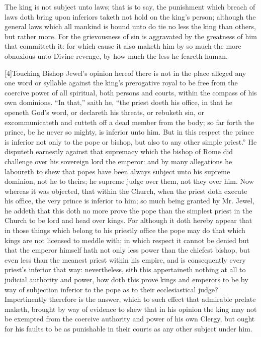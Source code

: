 The king is not subject unto laws; that is to say, the punishment which breach of laws doth bring upon inferiors  taketh not hold on the king’s person; although the general laws which all mankind is bound unto do tie no less the king than others, but rather more. For the grievousness of sin is aggravated by the greatness of him that committeth it: for which cause it also maketh him by so much the more obnoxious unto Divine revenge, by how much the less he feareth human.

[4]Touching Bishop Jewel’s opinion hereof there is not in the place alleged any one word or syllable against the king’s prerogative royal to be free from the coercive power of all spiritual, both persons and courts, within the compass of his own dominions. “In that,” saith he, “the priest doeth his office, in that he openeth God’s word, or declareth his threats, or rebuketh sin, or excommunicateth and cutteth off a dead member from the body; so far forth the prince, be he never so mighty, is inferior unto him. But in this respect the prince is inferior not only to the pope or bishop, but also to any other simple priest.” He disputeth earnestly against that supremacy which the bishop of Rome did challenge over his sovereign lord the emperor: and by many allegations he laboureth to shew that popes have been always subject unto his supreme dominion, not he to theirs; he supreme judge over them, not they over him. Now whereas it was objected, that within the Church, when the priest doth execute his office, the very prince is inferior to him; so much being granted by Mr. Jewel, he addeth that this doth no more prove the pope than the simplest priest in the Church to be lord and head over kings. For although it doth hereby appear that in those things which belong to his priestly office the pope may do that which kings are not licensed to meddle with; in which respect it cannot be denied but that the emperor himself hath not only less power than the chiefest bishop, but even less than the meanest priest within his empire, and is consequently every priest’s inferior that way: nevertheless, sith this appertaineth nothing at all to judicial authority and power, how doth this prove kings and emperors to be by way of subjection inferior to the pope as to their ecclesiastical judge? Impertinently therefore is the answer,  which to such effect that admirable prelate maketh, brought by way of evidence to shew that in his opinion the king may not be exempted from the coercive authority and power of his own Clergy, but ought for his faults to be as punishable in their courts as any other subject under him.


